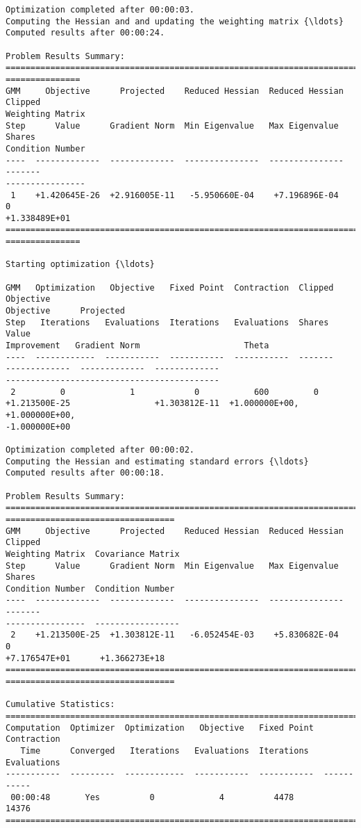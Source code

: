 \begin{Verbatim}[commandchars=\\\{\}]
Optimization completed after 00:00:03.
Computing the Hessian and and updating the weighting matrix {\ldots}
Computed results after 00:00:24.

Problem Results Summary:
================================================================================
===============
GMM     Objective      Projected    Reduced Hessian  Reduced Hessian  Clipped
Weighting Matrix
Step      Value      Gradient Norm  Min Eigenvalue   Max Eigenvalue   Shares
Condition Number
----  -------------  -------------  ---------------  ---------------  -------
----------------
 1    +1.420645E-26  +2.916005E-11   -5.950660E-04    +7.196896E-04      0
+1.338489E+01
================================================================================
===============

Starting optimization {\ldots}

GMM   Optimization   Objective   Fixed Point  Contraction  Clipped    Objective
Objective      Projected
Step   Iterations   Evaluations  Iterations   Evaluations  Shares       Value
Improvement   Gradient Norm                     Theta
----  ------------  -----------  -----------  -----------  -------
-------------  -------------  -------------
-------------------------------------------
 2         0             1            0           600         0
+1.213500E-25                 +1.303812E-11  +1.000000E+00, +1.000000E+00,
-1.000000E+00

Optimization completed after 00:00:02.
Computing the Hessian and estimating standard errors {\ldots}
Computed results after 00:00:18.

Problem Results Summary:
================================================================================
==================================
GMM     Objective      Projected    Reduced Hessian  Reduced Hessian  Clipped
Weighting Matrix  Covariance Matrix
Step      Value      Gradient Norm  Min Eigenvalue   Max Eigenvalue   Shares
Condition Number  Condition Number
----  -------------  -------------  ---------------  ---------------  -------
----------------  -----------------
 2    +1.213500E-25  +1.303812E-11   -6.052454E-03    +5.830682E-04      0
+7.176547E+01      +1.366273E+18
================================================================================
==================================

Cumulative Statistics:
===========================================================================
Computation  Optimizer  Optimization   Objective   Fixed Point  Contraction
   Time      Converged   Iterations   Evaluations  Iterations   Evaluations
-----------  ---------  ------------  -----------  -----------  -----------
 00:00:48       Yes          0             4          4478         14376
===========================================================================


\end{Verbatim}
